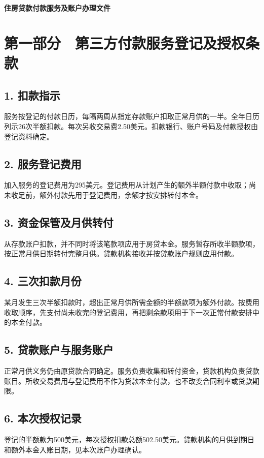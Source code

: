 \documentclass[UTF8,fontset=none,11pt,a4paper]{ctexart}
\begin{document}
{\noindent\LARGE\bfseries 住房贷款付款服务及账户办理文件\par}
\vspace{10pt}
\section*{第一部分　第三方付款服务登记及授权条款}
\subsection*{1. 扣款指示}
服务按登记的付款日历，每隔两周从指定存款账户扣取正常月供的一半。全年日历列示26次半额扣款。每次另收交易费2.50美元。扣款银行、账户号码及付款授权由登记资料确定。


\subsection*{2. 服务登记费用}
加入服务的登记费用为295美元。登记费用从计划产生的额外半额付款中收取；尚未收足前，额外付款先用于登记费用，余额才按安排转付本金。


\subsection*{3. 资金保管及月供转付}
从存款账户扣款，并不同时将该笔款项应用于房贷本金。服务暂存所收半额款项，按正常月供日期转付完整月供。贷款机构接收并按贷款账户规则应用付款。


\subsection*{4. 三次扣款月份}
某月发生三次半额扣款时，超出正常月供所需金额的半额款项为额外付款。按费用收取顺序，先支付尚未收完的登记费用，再把剩余款项用于下一次正常付款安排中的本金付款。


\subsection*{5. 贷款账户与服务账户}
正常月供义务仍由原贷款合同确定。服务负责收集和转付资金，贷款机构负责贷款账目。所收交易费用与登记费用不作为贷款本金付款，也不改变合同利率或贷款期限。


\subsection*{6. 本次授权记录}
登记的半额款为500美元，每次授权扣款总额502.50美元。贷款机构的月供到期日和额外本金入账日期，见本次账户办理确认。
\end{document}
